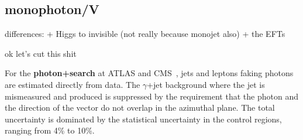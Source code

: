 \subsection{monophoton/V}



differences:
+ Higgs to invisible (not really because monojet also)
+ the EFTs 




ok let's cut this shit


For the \textbf{photon+\MET search} at ATLAS and CMS~\cite{Aaboud:2017dor,CMS-PAS-EXO-16-014}, jets and leptons faking photons are estimated directly from data.
The $\gamma$+jet background where the jet is mismeasured and produced \MET is suppressed by the requirement that the photon and the direction of the \MET vector do not overlap in the azimuthal plane. 
The total uncertainty is dominated by the statistical uncertainty in the control regions, ranging from 4\% to 10\%. 


